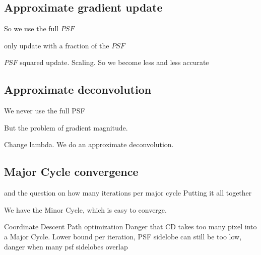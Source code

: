 \subsection{Approximate gradient update}

So we use the full $PSF$

only update with a fraction of the $PSF$

$PSF$ squared update. Scaling.
So we become less and less accurate


\subsection{Approximate deconvolution}

We never use the full PSF

But the problem of gradient magnitude. 

Change lambda. We do an approximate deconvolution. 


\subsection{Major Cycle convergence}
\cite{clark1980efficient} and the question on how many iterations per major cycle
Putting it all together

We have the Minor Cycle, which is easy to converge.

Coordinate Descent Path optimization \cite{friedman2010regularization}
Danger that CD takes too many pixel into a Major Cycle. Lower bound per iteration, PSF sidelobe
can still be too low, danger when many psf sidelobes overlap